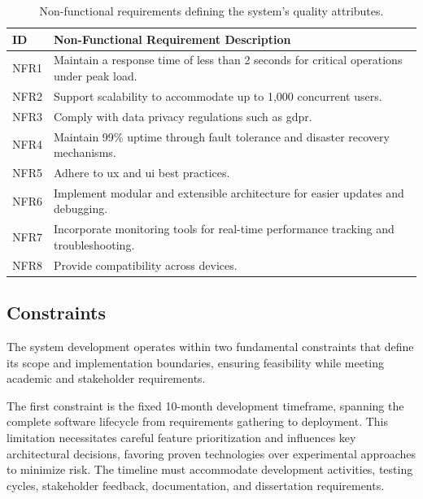 \begin{table}[!htb]
    \centering
    \begin{tabular}{|p{}|p{}|}
        \hline
        \textbf{ID} & \textbf{Non-Functional Requirement Description} \\ \hline
        NFR1 & Maintain a response time of less than 2 seconds for critical operations under peak load. \\ \hline
        NFR2 & Support scalability to accommodate up to 1,000 concurrent users. \\ \hline
        NFR3 & Comply with data privacy regulations such as \ac{gdpr}. \\ \hline
        NFR4 & Maintain 99\% uptime through fault tolerance and disaster recovery mechanisms. \\ \hline
        NFR5 & Adhere to \ac{ux} and \ac{ui} best practices. \\ \hline
        NFR6 & Implement modular and extensible architecture for easier updates and debugging. \\ \hline
        NFR7 & Incorporate monitoring tools for real-time performance tracking and troubleshooting. \\ \hline
        NFR8 & Provide compatibility across devices. \\ \hline
    \end{tabular}
    \caption[Non-Functional Requirements]{Non-functional requirements defining the system's quality attributes.}
    \label{tab:nonfunctional_requirements}
\end{table}



\subsection{Constraints} \label{section:constraints}

The system development operates within two fundamental constraints that define its scope and implementation boundaries, ensuring feasibility while meeting academic and stakeholder requirements.

The first constraint is the fixed 10-month development timeframe, spanning the complete software lifecycle from requirements gathering to deployment. This limitation necessitates careful feature prioritization and influences key architectural decisions, favoring proven technologies over experimental approaches to minimize risk. The timeline must accommodate development activities, testing cycles, stakeholder feedback, documentation, and dissertation requirements.

